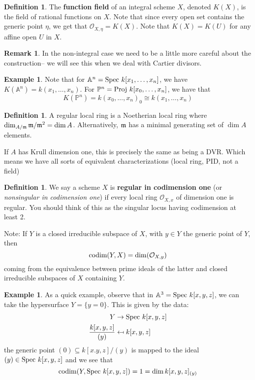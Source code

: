 \documentclass[10pt,reqno]{amsart}
\theoremstyle{definition}
\newtheorem{example}[theorem]{Example}
\newtheorem{definition}[theorem]{Definition}
\newtheorem{remark}[theorem]{Remark}
\theoremstyle{remark}
\numberwithin{equation}{section}
\numberwithin{theorem}{section}
\newcommand{\OO}{{\mathcal O}}
\newcommand{\spec}{\textup{Spec }}
\newcommand{\codim}{\textup{codim}}
\newcommand{\proj}{\textup{Proj }}
\newcommand{\A}{{\mathbb A}}
\newcommand{\PP}{{\mathbb P}}
\begin{document}
\begin{definition} The \textbf{function field} of an integral scheme $X$, denoted $K(X)$, is the field of rational functions on $X$. Note that since every open set contains the generic point $\eta$, we get that $\OO_{X,\eta} = K(X)$. Note that $K(X) = K(U)$ for any affine open $U$ in $X$.
\end{definition}

\begin{remark} In the non-integral case we need to be a little more careful about the construction-- we will see this when we deal with Cartier divisors.
\end{remark}

\begin{example}
Note that for $\A^n = \spec k[x_1,\dots,x_n]$, we have $K(\A^n) = k(x_1,\dots,x_n)$. For $\PP^n = \proj k[x_0,\dots,x_n]$, we have that
\[K(\PP^n) = k(x_0,\dots,x_n)_{0} \cong k(x_1,\dots,x_n)\]
\end{example}

\begin{definition} A regular local ring is a Noetherian local ring where $\dim_{A/\frak{m}} \frak{m}/\frak{m}^2 = \dim A$. Alternatively, $\frak{m}$ has a minimal generating set of $\dim A$ elements.

If $A$ has Krull dimension one, this is precisely the same as being a DVR. Which means we have all sorts of equivalent characterizations (local ring, PID, not a field)
\end{definition}

\begin{definition} We say a scheme $X$ is \textbf{regular in codimension one} (or \textit{nonsingular in codimension one}) if every local ring $\OO_{X,x}$ of dimension one is regular. You should think of this as the singular locus having codimension at least 2.

Note: If $Y$ is a closed irreducible subspace of $X$, with $y \in Y$ the generic point of $Y$, then 
\[\codim(Y,X) = \dim(\OO_{X,y})\]
coming from the equivalence between prime ideals of the latter and closed irreducible subspaces of $X$ containing $Y$.
\end{definition}

\begin{example} As a quick example, observe that in $\A^3 = \spec k[x,y,z]$, we can take the hypersurface $Y = \{y = 0\}$. This is given by the data:
\begin{align*}
Y &\to \spec k[x,y,z]\\
\frac{k[x,y,z]}{(y)}&\mapsfrom  k[x,y,z]
\end{align*}
the generic point $(0) \subseteq k[x.y,z]/(y)$ is mapped to the ideal $(y) \in \spec k[x,y,z]$ and we see that 
\[\codim(Y,\spec k[x,y,z]) = 1 = \dim k[x,y,z]_{(y)}\]
\end{example}
\end{document}
